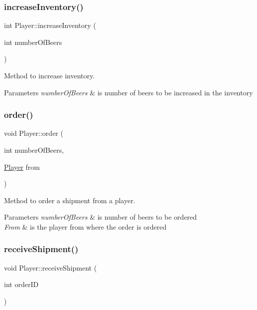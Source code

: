 \subsubsection{\texorpdfstring{increase\+Inventory()}{increaseInventory()}}
{\footnotesize\ttfamily int Player\+::increase\+Inventory (\begin{DoxyParamCaption}\item[{int}]{number\+Of\+Beers }\end{DoxyParamCaption})}



Method to increase inventory. 


\begin{DoxyParams}{Parameters}
{\em number\+Of\+Beers} & is number of beers to be increased in the inventory \\
\hline
\end{DoxyParams}
\mbox{\label{class_player_a473d9c248207e213abc5575859a51c1b}} 
\subsubsection{\texorpdfstring{order()}{order()}}
{\footnotesize\ttfamily void Player\+::order (\begin{DoxyParamCaption}\item[{int}]{number\+Of\+Beers,  }\item[{\hyperlink{class_player}{Player}}]{from }\end{DoxyParamCaption})}



Method to order a shipment from a player. 


\begin{DoxyParams}{Parameters}
{\em number\+Of\+Beers} & is number of beers to be ordered \\
\hline
{\em From} & is the player from where the order is ordered \\
\hline
\end{DoxyParams}
\mbox{\label{class_player_afd48e4062a9411e1f66cf23809b8c43f}} 
\subsubsection{\texorpdfstring{receive\+Shipment()}{receiveShipment()}}
{\footnotesize\ttfamily void Player\+::receive\+Shipment (\begin{DoxyParamCaption}\item[{int}]{order\+ID }\end{DoxyParamCaption})}



